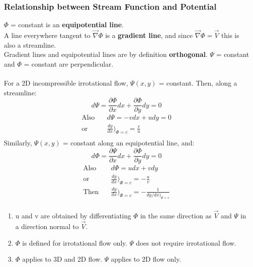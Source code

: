 \documentclass[draft=false, titlepage]{article}
\newcommand{\gradient}{\vec{\nabla}}
\newcommand{\partialfrac}[2]{\frac{\partial #1}{\partial #2}}
\begin{document}
\subsubsection{Relationship between Stream Function and Potential}
$\Phi$ = constant is an \textbf{equipotential line}.\\
A line everywhere tangent to $\gradient \Phi$ is a \textbf{gradient line}, and since $\gradient \Phi = \vec{V}$ this is also a streamline.\\
Gradient lines and equipotential lines are by definition \textbf{orthogonal}.
$\Psi$ = constant and $\Phi$ = constant are perpendicular.

\paragraph*{} For a 2D incompressible irrotational flow, $\Psi(x,y)$ = constant. Then, along a streamline:
\begin{equation*}
    d\Psi = \partialfrac{\Phi}{x}dx + \partialfrac{\Phi}{y}dy = 0
\end{equation*}
\begin{align*}
    \text{Also} & \quad d\Psi = -vdx + udy = 0\\
    \text{or} & \quad \frac{dy}{dx}\Big)_{\Phi = c} = \frac{v}{u}\\
\end{align*}
Similarly, $\Psi(x,y)$ = constant along an equipotential line, and:
\begin{equation*}
    d\Phi = \partialfrac{\Psi}{x}dx + \partialfrac{\Phi}{y}dy = 0
\end{equation*}
\begin{align*}
    \text{Also} & \quad d\Phi = udx + vdy\\
    \text{or} & \quad \frac{dy}{dx}\Big)_{\Phi = c} = -\frac{u}{v}\\
    \text{Then} & \quad \frac{dy}{dx}\Big)_{\Phi = c} = -\frac{1}{dy/dx\big)_{\Psi = c}}\\
\end{align*}

\begin{enumerate}
    \item u and v are obtained by differentiating $\Phi$ in the same direction as $\vec{V}$ and $\Psi$ in a direction normal to $\vec{V}$.
    \item $\Phi$ is defined for irrotational flow only. $\Psi$ does not require irrotational flow.
    \item $\Phi$ applies to 3D and 2D flow. $\Psi$ applies to 2D flow only.
\end{enumerate}
\end{document}
